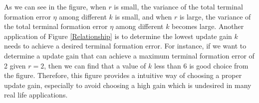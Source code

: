 \documentclass[12pt,draftcls,onecolumn]{IEEEtran}  %
\begin{document}
{\begin{figure}[h]
\end{figure}
As we can see in the figure, when $r$ is small, the variance of the total terminal formation error $\eta$ among different $k$ is small, and when $r$ is large, the variance of the total terminal formation error $\eta$ among different $k$ becomes large. Another application of Figure \ref{Relationship} is to determine the lowest update gain $k$ needs to achieve a desired terminal formation error. For instance, if we want to determine a update gain that can achieve a maximum terminal formation error of 2 given $r=2$, then we can find that a value of $k$ less than $6$ is good choice from the figure. Therefore, this figure provides a intuitive way of choosing a proper update gain, especially to avoid choosing a high gain which is undesired in many real life applications.

}
\end{document}

